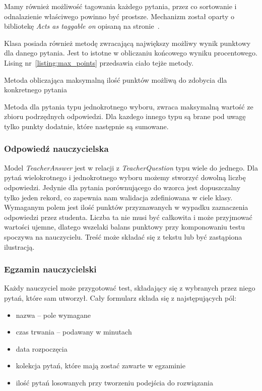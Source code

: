 \documentclass[a4paper,12pt]{article}
\begin{document}
Mamy również możliwość tagowania każdego pytania, przez co sortowanie i odnalazienie
właściwego powinno być prostsze. Mechanizm został oparty o bibliotekę \emph{Acts as taggable
on} opisaną na stronie~\pageref{sec:acts_as_taggable_on}.


Klasa posiada również metodę zwracającą największy możliwy wynik punktowy dla danego
pytania. Jest to istotne w obliczaniu końcowego wyniku procentowego. Lising
nr~\ref{listing:max_points} przedsawia ciało tejże metody.

\begin{listing}
  
  \caption{Metoda obliczająca maksymalną ilość punktów możliwą do zdobycia dla konkretnego pytania}
  \label{listing:max_points}
\end{listing}


Metoda dla pytania typu jednokrotnego wyboru, zwraca maksymalną wartość ze zbioru
podrzędnych odpowiedzi. Dla kazdego innego typu są brane pod uwagę tylko punkty dodatnie,
które następnie są sumowane.

\subsubsection{Odpowiedź nauczycielska}
Model \emph{TeacherAnswer} jest w relacji z \emph{TeacherQuestion} typu wiele do jednego.
Dla pytań wielokrotnego i jednokrotnego wyboru możemy stworzyć dowolną liczbę odpowiedzi.
Jedynie dla pytania porównującego do wzorca jest dopuszczalny tylko jeden rekord, co
zapewnia nam walidacja zdefiniowana w ciele klasy. Wymaganym polem jest ilość punktów
przyznawanych w wypadku zaznaczenia odpowiedzi przez studenta. Liczba ta nie musi być
całkowita i może przyjmować wartości ujemne, dlatego wszelaki balans punktowy przy
komponowaniu testu spoczywa na nauczycielu. Treść może składać się z tekstu lub być
zastąpiona ilustracją.

\subsubsection{Egzamin nauczycielski}
Każdy nauczyciel może przygotować test, składający się z wybranych przez niego pytań,
które sam utworzył. Cały formularz składa się z najstępujących pól:

\begin{itemize}
  \item{nazwa -- pole wymagane}
  \item{czas trwania -- podawany w minutach}
  \item{data rozpoczęcia}
  \item{kolekcja pytań, które mają zostać zawarte w egzaminie}
  \item{ilość pytań losowanych przy tworzeniu podejścia do rozwiązania}
\end{itemize}
\end{document}

